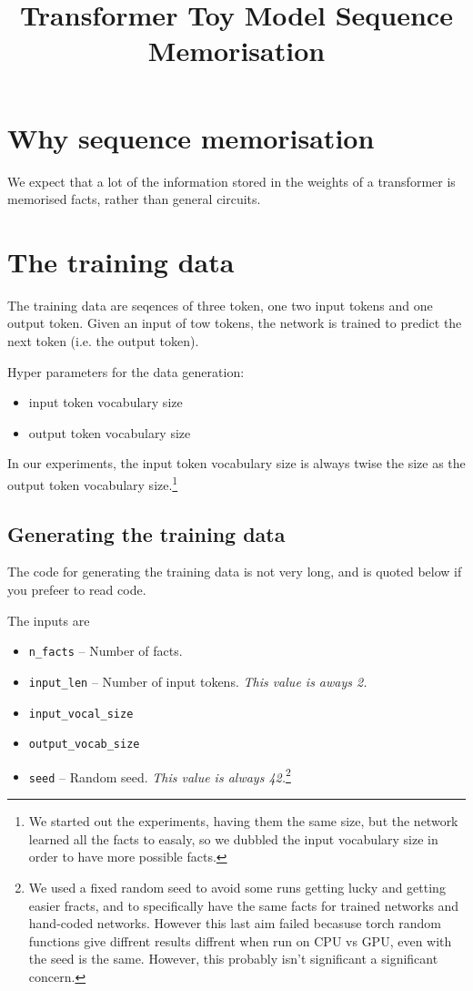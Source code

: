 \documentclass[11pt,a4paper]{article}
\title{Transformer Toy Model Sequence Memorisation}
\author{}
\date{}
\begin{document}
\maketitle

\section{Why sequence memorisation}
We expect that a lot of the information stored in the weights of a transformer is memorised facts, rather than general circuits. 

\section{The training data}
The training data are seqences of three token, one two input tokens and one output token. Given an input of tow tokens, the network is trained to predict the next token (i.e. the output token). 

Hyper parameters for the data generation:
\begin{itemize}
    \item input token vocabulary size
    \item output token vocabulary size
\end{itemize}

In our experiments, the input token vocabulary size is always twise the size as the output token vocabulary size.\footnote{We started out the experiments, having them the same size, but the network learned all the facts to easaly, so we dubbled the input vocabulary size in order to have more possible facts.}

\subsection{Generating the training data}

The code for generating the training data is not very long, and is quoted below if you prefeer to read code. 

The inputs are 
\begin{itemize}
    \item \verb|n_facts| -- Number of facts.
    \item \verb|input_len| -- Number of input tokens. \emph{This value is aways 2.}
    \item \verb|input_vocal_size|
    \item \verb|output_vocab_size|
    \item \verb|seed| -- Random seed. \emph{This value is always 42.}\footnote{We used a fixed random seed to avoid some runs getting lucky and getting easier fracts, and to specifically have the same facts for trained networks and hand-coded networks. However this last aim failed becasuse torch random functions give diffrent results diffrent when run on CPU vs GPU, even with the seed is the same. However, this probably isn't significant a significant concern.}
\end{itemize}
\end{document}
